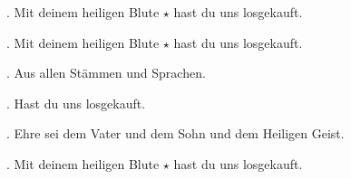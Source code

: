 \Rbar. Mit deinem heiligen Blute $\star$ hast du uns losgekauft.

\Rbar. Mit deinem heiligen Blute $\star$ hast du uns losgekauft.

\Vbar. Aus allen Stämmen und Sprachen. 

\Rbar. Hast du uns losgekauft.

\Vbar. Ehre sei dem Vater und dem Sohn und dem Heiligen Geist.

\Rbar. Mit deinem heiligen Blute $\star$ hast du uns losgekauft.